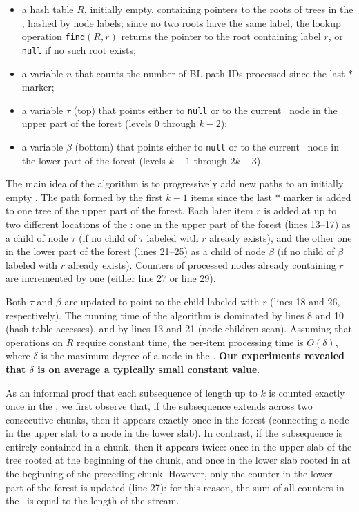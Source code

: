 \begin{itemize}[parsep=0pt]
\item a hash table $R$, initially empty, containing pointers to the roots of trees in the \ksf, hashed by node labels; since no two roots have the same label, the lookup operation {\tt find}$(R, r)$ returns the pointer to the root containing label $r$, or {\tt null} if no such root exists;
\item a variable $n$ that counts the number of BL path IDs processed since the last $*$ marker;
\item a variable $\tau$ (top) that points either to {\tt null} or to the current \ksf\ node in the upper part of the forest (levels 0 through $k-2$);
\item a variable $\beta$ (bottom) that points either to {\tt null} or to the current \ksf\ node in the lower part of the forest (levels $k-1$ through $2k-3$).
\end{itemize}

\noindent
The main idea of the algorithm is to progressively add new paths to an initially empty \ksf. The path formed by the first $k-1$ items since the last $*$ marker is added to one tree of the upper part of the forest. Each later item $r$ is added at up to two different locations of the \ksf: one in the upper part of the forest (lines 13--17) as a child of node $\tau$ (if no child of $\tau$ labeled with $r$ already exists), and the other one in the lower part of the forest (lines 21--25) as a child of node $\beta$ (if no child of $\beta$ labeled with $r$ already exists). Counters of processed nodes already containing $r$ are incremented by one (either line 27 or line 29).

Both $\tau$ and $\beta$ are updated to point to the child labeled with $r$ (lines 18 and 26, respectively). The running time of the algorithm is dominated by lines 8 and 10 (hash table accesses), and by lines 13 and 21 (node children scan). Assuming that operations on $R$ require constant time, the per-item processing time is $O(\delta)$, where $\delta$ is the maximum degree of a node in the \ksf. {\bf Our experiments revealed that $\delta$ is on average a typically small constant value}.

As an informal proof that each subsequence of length up to $k$ is counted exactly once in the \ksf, we first observe that, if the subsequence extends across two consecutive chunks, then it appears exactly once in the forest (connecting a node in the upper slab to a node in the lower slab). In contrast, if the subsequence is entirely contained in a chunk, then it appears twice: once in the upper slab of the tree rooted at the beginning of the chunk, and once in the lower slab rooted in at the beginning of the preceding chunk. However, only the counter in the lower part of the forest is updated (line 27): for this reason, the sum of all counters in the \ksf\ is equal to the length of the stream.

